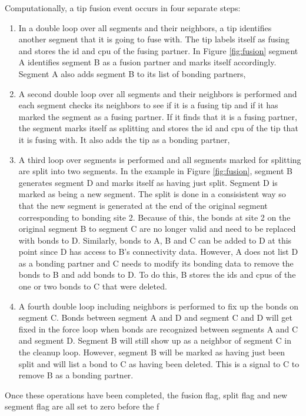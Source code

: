 \documentclass[12pt]{article}
\begin{document}
Computationally, a tip fusion event occurs in four separate steps:
\begin{enumerate}
\item In a double loop over all segments and their neighbors, a tip identifies another segment
that it is going to fuse with. The tip labels itself as fusing and stores the id and cpu of the
fusing partner. In Figure \ref{fig:fusion} segment A identifies segment B as a fusion partner
and marks itself accordingly. Segment A also adds segment B to its list of bonding partners,
\item A second double loop over all segments and their neighbors is performed and each segment
checks its neighbors to see if it is a fusing tip and if it has marked the segment as a fusing
partner. If it finds that it is a fusing partner, the segment marks itself as splitting and
stores the id and cpu of the tip that it is fusing with. It also adds the tip as a bonding
partner,
\item A third loop over segments is performed and all segments marked for splitting are split
into two segments. In the example in Figure \ref{fig:fusion}, segment B generates segment D and
marks itself as having just split. Segment D is marked as being a new segment.
The split is done in a consisistent way so that the new segment is generated at the end of the
original segment corresponding to bonding site 2. Because of this, the bonds at site 2 on the
original segment B to segment C are no longer valid and need to be replaced with bonds to D.
Similarly, bonds to A, B and C can be added to D at this point since D has access to B's
connectivity data. However, A does not list D as a bonding partner and C needs to modify its
bonding data to remove the bonds to B and add bonds to D. To do this, B stores the ids and cpus
of the one or two bonds to C that were deleted.
\item A fourth double loop including neighbors is performed to fix up the bonds on segment C.
Bonds between segment A and D and segment C and D will get fixed in the force loop when
bonds are recognized between segments A and C and segment D. Segment B will still show up as
a neighbor of
segment C in the cleanup loop. However, segment B will be marked as having just been split and
will list a
bond to C as having been deleted. This is a signal to C to remove B as a bonding partner.
\end{enumerate}
Once these operations have been completed, the fusion flag, split flag and new segment flag are
all set to zero before the f
\end{document}

